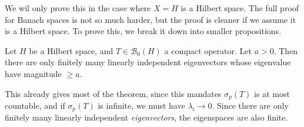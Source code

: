 \documentclass[a4paper]{article}
\begin{document}
We wil only prove this in the case where $X = H$ is a Hilbert space. The full proof for Banach spaces is not so much harder, but the proof is cleaner if we assume it is a Hilbert space. To prove this, we break it down into smaller propositions.

\begin{prop}
  Let $H$ be a Hilbert space, and $T \in \mathcal{B}_0(H)$ a compact operator. Let $a > 0$. Then there are only finitely many linearly independent eigenvectors whose eigenvalue have magnitude $\geq a$.
\end{prop}
This already gives most of the theorem, since this mandates $\sigma_p(T)$ is at most countable, and if $\sigma_p(T)$ is infinite, we must have $\lambda_i \to 0$. Since there are only finitely many linearly independent \emph{eigenvectors}, the eigenspaces are also finite.
\end{document}
